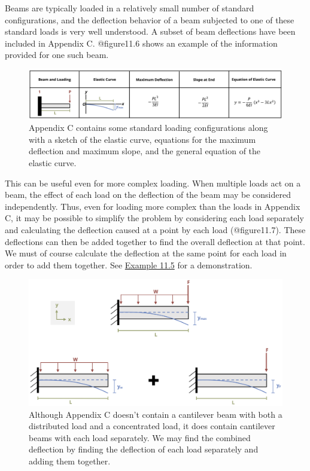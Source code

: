 \documentclass[
  letterpaper,
  DIV=11,
  numbers=noendperiod]{scrreprt}
\theoremstyle{definition}
\theoremstyle{remark}
\begin{document}
Beams are typically loaded in a relatively small number of standard
configurations, and the deflection behavior of a beam subjected to one
of these standard loads is very well understood. A subset of beam
deflections have been included in Appendix C. @figure11.6 shows an
example of the information provided for one such beam.

\begin{figure}

{\centering \includegraphics{images/CH11 PNGs/11.6.png}

}

\caption{Appendix C contains some standard loading configurations along
with a sketch of the elastic curve, equations for the maximum deflection
and maximum slope, and the general equation of the elastic curve.}

\end{figure}%

This can be useful even for more complex loading. When multiple loads
act on a beam, the effect of each load on the deflection of the beam may
be considered independently. Thus, even for loading more complex than
the loads in Appendix C, it may be possible to simplify the problem by
considering each load separately and calculating the deflection caused
at a point by each load (@figure11.7). These deflections can then be
added together to find the overall deflection at that point. We must of
course calculate the deflection at the same point for each load in order
to add them together. See \hyperref[example-11.5]{Example 11.5} for a
demonstration.

\begin{figure}

{\centering \includegraphics{images/CH11 PNGs/11.7.png}

}

\caption{Although Appendix C doesn't contain a cantilever beam with both
a distributed load and a concentrated load, it does contain cantilever
beams with each load separately. We may find the combined deflection by
finding the deflection of each load separately and adding them
together.}

\end{figure}%
\end{document}
